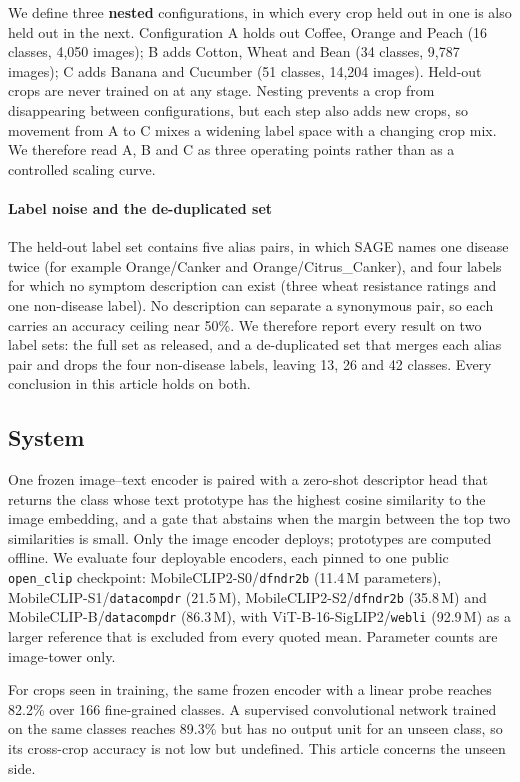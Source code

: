 \documentclass[a4paper,fleqn]{cas-dc}
\begin{document}
We define three \textbf{nested} configurations, in which every crop held out in one is also held out
in the next. Configuration A holds out Coffee, Orange and Peach (16 classes, 4{,}050 images);
B adds Cotton, Wheat and Bean (34 classes, 9{,}787 images); C adds Banana and Cucumber (51 classes,
14{,}204 images). Held-out crops are never trained on at any stage. Nesting prevents a crop from
disappearing between configurations, but each step also adds new crops, so movement from A to C
mixes a widening label space with a changing crop mix. We therefore read A, B and C as three
operating points rather than as a controlled scaling curve.

\paragraph{Label noise and the de-duplicated set} The held-out label set contains five alias
pairs, in which SAGE names one disease twice (for example Orange/Canker and Orange/Citrus\_Canker),
and four labels for which no symptom description can exist (three wheat resistance ratings and one
non-disease label). No description can separate a synonymous pair, so each carries an accuracy
ceiling near 50\%. We therefore report every result on two label sets: the full set as released, and
a de-duplicated set that merges each alias pair and drops the four non-disease labels, leaving 13, 26
and 42 classes. Every conclusion in this article holds on both.

\subsection{System}
\label{sec:system}

One frozen image--text encoder is paired with a zero-shot descriptor head that returns the class
whose text prototype has the highest cosine similarity to the image embedding, and a gate that
abstains when the margin between the top two similarities is small. Only the image encoder deploys;
prototypes are computed offline. We evaluate four deployable encoders, each pinned to one public
\texttt{open\_clip} checkpoint: MobileCLIP2-S0/\texttt{dfndr2b} (11.4\,M parameters),
MobileCLIP-S1/\texttt{datacompdr} (21.5\,M), MobileCLIP2-S2/\texttt{dfndr2b} (35.8\,M) and
MobileCLIP-B/\texttt{datacompdr} (86.3\,M), with ViT-B-16-SigLIP2/\texttt{webli} (92.9\,M) as a
larger reference that is excluded from every quoted mean. Parameter counts are image-tower only.

For crops seen in training, the same frozen encoder with a linear probe reaches 82.2\% over 166
fine-grained classes. A supervised convolutional network trained on the same classes reaches 89.3\%
but has no output unit for an unseen class, so its cross-crop accuracy is not low but undefined.
This article concerns the unseen side.
\end{document}
